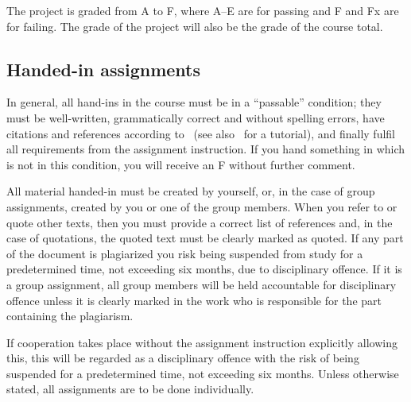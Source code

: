 The project is graded from A to F, where A--E are for passing and F and Fx are 
for failing.
The grade of the project will also be the grade of the course total.

\subsection{Handed-in assignments}


In general, all hand-ins in the course must be in a \enquote{passable} 
condition; \ie they must be well-written, grammatically correct and without 
spelling errors, have citations and references according to~\cite{IEEEcitation} 
(see also~\cite{PurdueCitation} for a tutorial), and finally fulfil all 
requirements from the assignment instruction.
If you hand something in which is not in this condition, you will receive an 
F without further comment.

All material handed-in must be created by yourself, or, in the case of group 
assignments, created by you or one of the group members.
When you refer to or quote other texts, then you must provide a correct list of 
references and, in the case of quotations, the quoted text must be clearly 
marked as quoted.
If any part of the document is plagiarized you risk being suspended from study 
for a predetermined time, not exceeding six months, due to disciplinary 
offence.
If it is a group assignment, all group members will be held accountable for 
disciplinary offence unless it is clearly marked in the work who is responsible 
for the part containing the plagiarism.

If cooperation takes place without the assignment instruction explicitly 
allowing this, this will be regarded as a disciplinary offence with the risk of
being suspended for a predetermined time, not exceeding six months.
Unless otherwise stated, all assignments are to be done individually.

